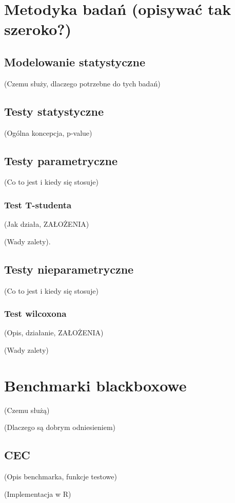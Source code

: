 \documentclass[12pt,a4paper]{report}
\begin{document}
{{{\section{Metodyka badań (opisywać tak szeroko?)}
\subsection{Modelowanie statystyczne}
\par{
(Czemu służy, dlaczego potrzebne do tych badań)
}
\subsection{Testy statystyczne}
\par{
(Ogólna koncepcja, p-value)
}
\subsection{Testy parametryczne}
\par{
(Co to jest i kiedy się stosuje)
}
\subsubsection{Test T-studenta}
\par{
(Jak działa, ZAŁOŻENIA)
}
\par{
(Wady zalety).
}

\subsection{Testy nieparametryczne}
\par{
(Co to jest i kiedy się stosuje)
}
\subsubsection{Test wilcoxona}
\par{
(Opis, działanie, ZAŁOŻENIA)
}
\par{
(Wady zalety)
}
\section{Benchmarki blackboxowe}
\par{
(Czemu służą)
}
\par{
(Dlaczego są dobrym odniesieniem)
}

\subsection{CEC}
\label{CEC2013chapter}
\par{
(Opis benchmarka, funkcje testowe)
}
\par{
(Implementacja w R)
}

}}}
\end{document}
